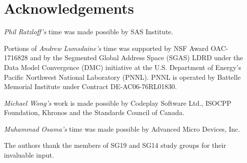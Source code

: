 
\section*{Acknowledgements}

\textit{Phil Ratzloff's} time was made possible by SAS Institute.

Portions of \textit{Andrew Lumsdaine's} time was supported by NSF Award OAC-1716828 and by the
Segmented Global Address Space (SGAS) LDRD under the Data Model Convergence (DMC)
initiative at the U.S. Department of Energy's Pacific Northwest National Laboratory
(PNNL). PNNL is operated by Battelle Memorial Institute under Contract
DE-AC06-76RL01830.

\textit{Michael Wong's} work is made possible by Codeplay Software Ltd., ISOCPP Foundation, Khronos and the Standards Council of Canada.  

\textit{Muhammad Osama's} time was made possible by Advanced Micro Devices, Inc.

The authors thank the members of SG19 and SG14 study groups for their invaluable input.
